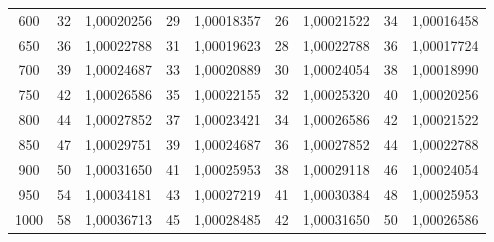 \begin{table}[H]
\begin{tabular}{c S[table-format=2.0] S[table-format=1.8] S[table-format=2.0] S[table-format=1.8] S[table-format=2.0] S[table-format=1.8] S[table-format=2.0] S[table-format=1.8]}
    600   &   32   & 1,00020256   &   29   & 1,00018357   &   26    & 1,00021522  &    34 &  1,00016458   \\
    650   &   36   & 1,00022788   &   31   & 1,00019623   &   28    & 1,00022788  &    36 &  1,00017724   \\
    700   &   39   & 1,00024687   &   33   & 1,00020889   &   30    & 1,00024054  &    38 &  1,00018990   \\
    750   &   42   & 1,00026586   &   35   & 1,00022155   &   32    & 1,00025320  &    40 &  1,00020256   \\
    800   &   44   & 1,00027852   &   37   & 1,00023421   &   34    & 1,00026586  &    42 &  1,00021522   \\
    850   &   47   & 1,00029751   &   39   & 1,00024687   &   36    & 1,00027852  &    44 &  1,00022788   \\
    900   &   50   & 1,00031650   &   41   & 1,00025953   &   38    & 1,00029118  &    46 &  1,00024054   \\
    950   &   54   & 1,00034181   &   43   & 1,00027219   &   41    & 1,00030384  &    48 &  1,00025953   \\
    1000  &   58   & 1,00036713   &   45   & 1,00028485   &   42    & 1,00031650  &    50 &  1,00026586   \\ 
    \bottomrule
  \end{tabular}
\end{table}


